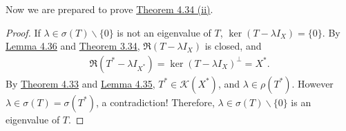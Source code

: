 \documentclass{article}
\renewcommand{\proofname}{\textit{Proof}}
\begin{document}
Now we are prepared to prove \hyperref[thm:4.34]{Theorem 4.34 (ii)}.

\renewcommand{\proofname}{Proof of \hyperref[thm:4.34]{Theorem 4.34 (ii)}}
\begin{proof}
If $\lambda\in\sigma(T)\backslash\{0\}$ is not an eigenvalue of $T$, $\ker(T-\lambda I_X)=\{0\}$. By \hyperref[lemma:4.36]{Lemma 4.36} and \hyperref[thm:3.34]{Theorem 3.34}, $\mathfrak{R}(T-\lambda I_X)$ is closed, and
\begin{align*}
	\mathfrak{R}(T^*-\lambda I_{X^*}) = \ker(T-\lambda I_X)^\perp = X^*.
\end{align*}
By \hyperref[thm:4.33]{Theorem 4.33} and \hyperref[lemma:4.35]{Lemma 4.35}, $T^*\in\mathcal{K}(X^*)$, and $\lambda\in\rho(T^*)$. However $\lambda\in\sigma(T)=\sigma(T^*)$, a contradiction! Therefore, $\lambda\in\sigma(T)\backslash\{0\}$ is an eigenvalue of $T$.
\end{proof}
\renewcommand{\proofname}{Proof}
\end{document}
